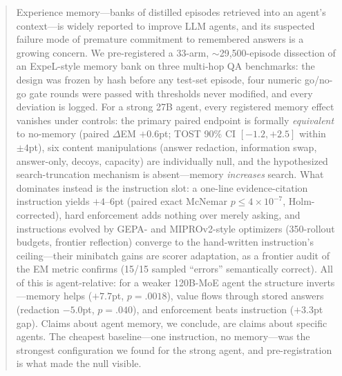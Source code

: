 \begin{abstract}
Experience memory---banks of distilled episodes retrieved into an agent's context---is widely reported to improve LLM agents, and its suspected failure mode of premature commitment to remembered answers is a growing concern. We pre-registered a 33-arm, $\sim$29{,}500-episode dissection of an ExpeL-style memory bank on three multi-hop QA benchmarks: the design was frozen by hash before any test-set episode, four numeric go/no-go gate rounds were passed with thresholds never modified, and every deviation is logged. For a strong 27B agent, every registered memory effect vanishes under controls: the primary paired endpoint is formally \emph{equivalent} to no-memory (paired $\Delta$EM $+0.6$pt; TOST 90\% CI $[-1.2,+2.5]$ within $\pm4$pt), six content manipulations (answer redaction, information swap, answer-only, decoys, capacity) are individually null, and the hypothesized search-truncation mechanism is absent---memory \emph{increases} search. What dominates instead is the instruction slot: a one-line evidence-citation instruction yields $+4$--$6$pt (paired exact McNemar $p\le4\times10^{-7}$, Holm-corrected), hard enforcement adds nothing over merely asking, and instructions evolved by GEPA- and MIPROv2-style optimizers (350-rollout budgets, frontier reflection) converge to the hand-written instruction's ceiling---their minibatch gains are scorer adaptation, as a frontier audit of the EM metric confirms (15/15 sampled ``errors'' semantically correct). All of this is agent-relative: for a weaker 120B-MoE agent the structure inverts---memory helps ($+7.7$pt, $p{=}.0018$), value flows through stored answers (redaction $-5.0$pt, $p{=}.040$), and enforcement beats instruction ($+3.3$pt gap). Claims about agent memory, we conclude, are claims about specific agents. The cheapest baseline---one instruction, no memory---was the strongest configuration we found for the strong agent, and pre-registration is what made the null visible.
\end{abstract}
